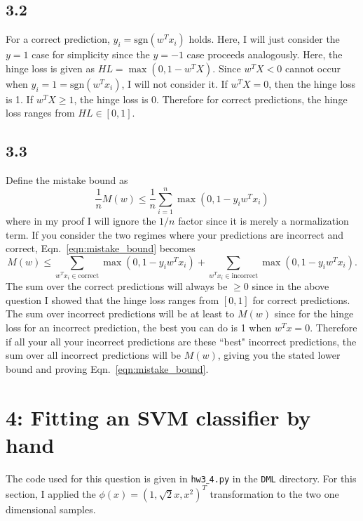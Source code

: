 \documentclass[12pt]{amsart}
\begin{document}
\subsection*{3.2}
For a correct prediction, $y_i = \text{sgn}(w^Tx_i)$ holds.  Here, I will just consider the $y = 1$ case for simplicity since the $y = -1$ case proceeds analogously.  Here, the hinge loss is given as $HL = \max(0,1-w^TX)$.  Since $w^TX < 0$ cannot occur when $y_i = 1 = \text{sgn}(w^Tx_i)$, I will not consider it.  If $w^TX = 0$, then the hinge loss is 1.  If $w^TX \geq 1$, the hinge loss is 0.  Therefore for correct predictions, the hinge loss ranges from $HL \in [0,1]$.

\subsection*{3.3}
Define the mistake bound as
\begin{equation} \label{eqn:mistake_bound}
\frac{1}{n}M(w) \leq \frac{1}{n}\sum_{i = 1}^n \max(0, 1 - y_i w^T x_i)
\end{equation}
where in my proof I will ignore the $1/n$ factor since it is merely a normalization term.  If you consider the two regimes where your predictions are incorrect and correct, Eqn.~\ref{eqn:mistake_bound} becomes
\begin{equation} \label{eqn:mb} 
M(w) \leq \sum_{w^Tx_i \in \text{correct}} \max(0, 1 - y_i w^T x_i) + \sum_{w^Tx_i \in \text{incorrect}} \max(0, 1 - y_i w^T x_i).
\end{equation}
The sum over the correct predictions will always be $\geq 0$ since in the above question I showed that the hinge loss ranges from $[0,1]$ for correct predictions.  The sum over incorrect predictions will be at least to $M(w)$ since for the hinge loss for an incorrect prediction, the best you can do is 1 when $w^Tx = 0$.  Therefore if all your all your incorrect predictions are these ``best" incorrect predictions, the sum over all incorrect predictions will be $M(w)$, giving you the stated lower bound and proving Eqn.~\ref{eqn:mistake_bound}.  

\section*{4: Fitting an SVM classifier by hand}

The code used for this question is given in {\tt hw3$\_$4.py} in the {\tt DML} directory.  For this section, I applied the $\phi(x) = (1, \sqrt{2}x, x^2)^T$ transformation to the two one dimensional samples.
\end{document}
